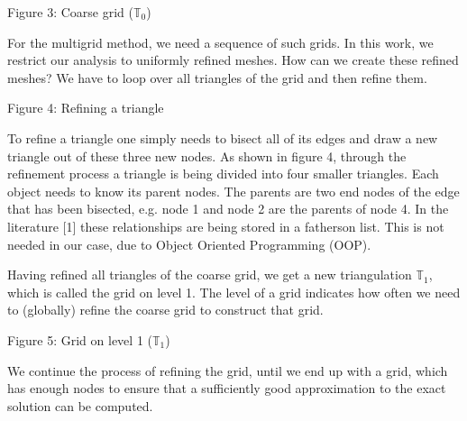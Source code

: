 \documentclass[letterpaper,10pt,english, openany]{sphinxmanual}
\begin{document}
\begin{figure}[H]
\centering
\def\svgwidth{0.6\columnwidth}
    
\end{figure}

\begin{center}Figure 3: Coarse grid (\(\mathbb{T}_0\))
\end{center}
For the multigrid method, we need a sequence of such grids.
In this work, we restrict our analysis to uniformly refined meshes.
How can we create these refined meshes? We have to loop over all triangles of the grid
and then refine them.

\begin{figure}[H]
\centering
\def\svgwidth{0.4\columnwidth}
    
\end{figure}

\begin{center}Figure 4: Refining a triangle
\end{center}
To refine a triangle one simply needs to bisect all of its edges and draw a new triangle out of these three new nodes.
As shown in figure 4, through the refinement process a triangle is being divided
into four smaller triangles. Each  object needs to know its parent nodes.
The parents are two end nodes of the edge that has been bisected, e.g. node 1 and node 2 are the parents of node 4.
In the literature {[}1{]} these relationships are being stored in a father\sphinxhyphen{}son list.
This is not needed in our case, due to Object Oriented Programming (OOP).

Having refined all triangles of the coarse grid, we get a new triangulation \(\mathbb{T}_1\),
which is called the grid on level 1. The {\color{blue}level} of a grid indicates how often we need to (globally)
refine the coarse grid to construct that grid.

\begin{figure}[H]
\centering
\def\svgwidth{0.6\columnwidth}
    
\end{figure}

\begin{center}Figure 5: Grid on level 1 (\(\mathbb{T}_1\))
\end{center}
We continue the process of refining the grid, until we end up with a grid, which has enough nodes
to ensure that a sufficiently good approximation to the exact solution can be computed.

\begin{figure}[H]
\centering
\def\svgwidth{0.6\columnwidth}
    
\end{figure}
\end{document}

